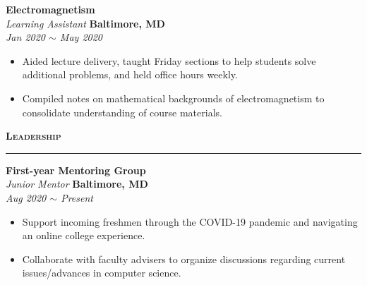 \documentclass[10pt, letterpaper]{article}
\begin{document}
\begin{paracol}{2}
	\textbf{Electromagnetism}\\
	\textit{Learning Assistant}
	\switchcolumn
	\raggedleft\textbf{Baltimore, MD}\\
	\raggedleft\textit{Jan 2020 $\sim$ May 2020}
\end{paracol}
\vspace{-5mm}
\begin{itemize}
	\item Aided lecture delivery, taught Friday sections to help students solve additional problems, and held office hours weekly.
	\vspace{-3mm}
	\item Compiled notes on mathematical backgrounds of electromagnetism to consolidate understanding of course materials.
\end{itemize}
\vspace{-3mm}

{\large \textbf{\textsc{Leadership}}}
\vspace{5pt}
\hrule

\begin{paracol}{2}
	\textbf{First-year Mentoring Group}\\
	\textit{Junior Mentor}
	\switchcolumn
	\raggedleft\textbf{Baltimore, MD}\\
	\raggedleft\textit{Aug 2020 $\sim$ Present}
\end{paracol}
\vspace{-5mm}
\begin{itemize}
	\item Support incoming freshmen through the COVID-19 pandemic and navigating an online college experience.
	\vspace{-3mm}
	\item Collaborate with faculty advisers to organize discussions regarding current issues/advances in computer science.
\end{itemize}
\vspace{-3mm}

\iffalse
\begin{paracol}{2}
	\textbf{Global Medical Brigades}\\
	\textit{Executive Board Member}
	\switchcolumn
	\raggedleft\textbf{Tegucigalpa, Honduras}\\
	\raggedleft\textit{Jan 2019 $\sim$ May 2020}
\end{paracol}
\vspace{-5mm}
\begin{itemize}
	\item Assisted three Honduran communities in building sanitation and clean water infrastructure.\vspace{-3mm}
	\item Headed donation drives with fellow volunteers to gather over 1,400 sanitation bundles to sponsor future brigades.
\end{itemize}
\vspace{-3mm}
\fi
\end{document}
